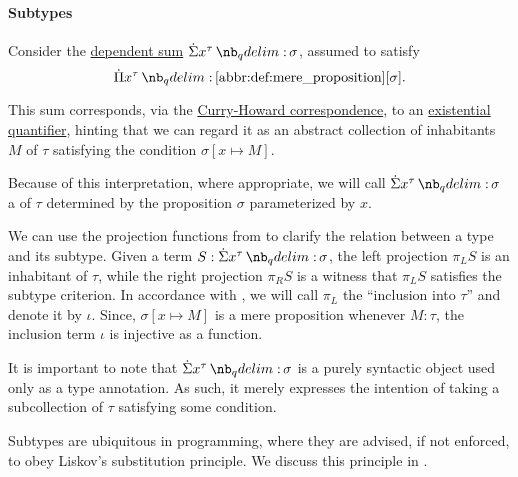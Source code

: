\paragraph{Subtypes}

\begin{definition}\label{def:subtype}
  Consider the \hyperref[def:dependent_sum]{dependent sum} \( \qsum {x^\tau} \sigma \), assumed to satisfy
  \begin{equation}\label{eq:def:subtype}
    \qprod {x^\tau} \ref{abbr:def:mere_proposition}[\sigma].
  \end{equation}

  This sum corresponds, via the \hyperref[con:curry_howard_correspondence]{Curry-Howard correspondence}, to an \hyperref[def:first_order_language/quantifiers]{existential quantifier}, hinting that we can regard it as an abstract collection of inhabitants \( M \) of \( \tau \) satisfying the condition \( \sigma[x \mapsto M] \).

  Because of this interpretation, where appropriate, we will call \( \qsum {x^\tau} \sigma \) a  of \( \tau \) determined by the proposition \( \sigma \) parameterized by \( x \).

  We can use the projection functions from  to clarify the relation between a type and its subtype. Given a term \( S: \qsum {x^\tau} \sigma \), the left projection \( \pi_L S \) is an inhabitant of \( \tau \), while the right projection \( \pi_R S \) is a witness that \( \pi_L S \) satisfies the subtype criterion. In accordance with , we will call \( \pi_L \) the \enquote{inclusion into \( \tau \)} and denote it by \( \iota \). Since, \( \sigma[x \mapsto M] \) is a mere proposition whenever \( M: \tau \), the inclusion term \( \iota \) is injective as a function.
\end{definition}
\begin{comments}
  \item It is important to note that \( \qsum {x^\tau} \sigma \) is a purely syntactic object used only as a type annotation. As such, it merely expresses the intention of taking a subcollection of \( \tau \) satisfying some condition.

  \item Subtypes are ubiquitous in programming, where they are advised, if not enforced, to obey Liskov's substitution principle. We discuss this principle in .
\end{comments}

